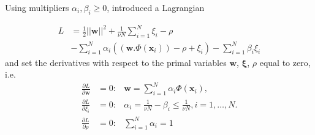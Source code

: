 \documentclass[conference]{IEEEtran}
\begin{document}
Using multipliers $\alpha_i,\beta_i\geq0$, \cite{scholkopf2001estimating} introduced a Lagrangian

\begin{align}
\label{equ:lagrangian}
L &=\frac{1}{2}\left|\left| \mathbf{w}\right|\right|^2 + \frac{1}{\nu N}\sum_{i=1}^N\xi_i - \rho \nonumber \\
&-\sum_{i=1}^N\alpha_i((\mathbf{w}.\Phi(\mathbf{x}_i))-\rho +\xi_i)-\sum_{i=1}^N\beta_i\xi_i
\end{align}
and set the derivatives with respect to the primal variables $\mathbf{w}$, $\boldsymbol{\xi}$, $\rho$ equal to zero, i.e.
\begin{eqnarray}
\label{equ:supportvm}
\frac{\partial L}{\partial \mathbf{w}} & = 0: & \mathbf{w}=\sum_{i=1}^N\alpha_i\Phi(\mathbf{x}_i),\\%
\label{equ:alphai1}
\frac{\partial L}{\partial \xi_i}  & =0: & \alpha_i=\frac{1}{\nu N}-\beta_i \leq \frac{1}{\nu N},  i=1,\ldots,N. \\
\label{equ:alphai2}
\frac{\partial L}{\partial \rho} & = 0: & \sum_{i=1}^N\alpha_i=1
\end{eqnarray}
\end{document}
